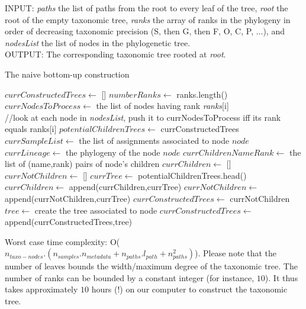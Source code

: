 \documentclass{report}
\begin{document}
\textsc{INPUT:} \emph{paths} the list of paths from the root to every leaf of the tree, \emph{root} the root of the empty taxonomic tree, \emph{ranks} the array of ranks in the phylogeny in order of decreasing taxonomic precision (S, then G, then F, O, C, P, ...), and \emph{nodesList} the list of nodes in the phylogenetic tree.\\

\textsc{OUTPUT:} The corresponding taxonomic tree rooted at \emph{root}.\\

\begin{algorithm}
\caption{The naive bottom-up construction}
\begin{algorithmic}
\STATE $currConstructedTrees \leftarrow$ []
\STATE $numberRanks \leftarrow$ ranks.length()
\STATE $currNodesToProcess \leftarrow$ the list of nodes having rank \emph{ranks}[i]\\ //look at each node in \emph{nodesList}, push it to currNodesToProcess iff its rank equals ranks[i]
\STATE $potentialChildrenTrees \leftarrow$ currConstructedTrees
\STATE $currSampleList \leftarrow$ the list of assignments associated to node $node$
\STATE $currLineage \leftarrow$ the phylogeny of the node $node$
\STATE $currChildrenNameRank \leftarrow$ the list of (name,rank) pairs of node's children
\STATE $currChildren \leftarrow$ []
\STATE $currNotChildren \leftarrow$ []
\STATE $currTree \leftarrow$ potentialChildrenTrees.head()
\STATE $currChildren \leftarrow$ append(currChildren,currTree)
\ELSE
\STATE $currNotChildren \leftarrow$ append(currNotChildren,currTree)
\ENDIF
\STATE $currConstructedTrees \leftarrow$ currNotChildren
\STATE $tree \leftarrow$ create the tree associated to node 
\STATE $currConstructedTrees \leftarrow$ append(currConstructedTrees,tree)
\ENDWHILE
\ENDFOR
\ENDFOR
{}
\end{algorithmic}
\end{algorithm}

Worst case time complexity: O($n_{taxo-nodes}.(n_{samples}.n_{metadata} + n_{paths}.l_{path} + n_{paths}^{2})$). Please note that the number of leaves bounds the width/maximum degree of the taxonomic tree. The number of ranks can be bounded by a constant integer (for instance, $10$). It thus takes approximately $10$ hours (!) on our computer to construct the taxonomic tree.\\
\end{document}
